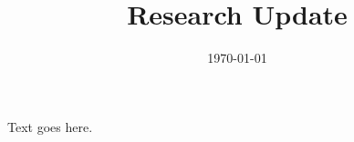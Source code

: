 \documentclass{dailyupdate}
\date{\today}
\title{Research Update}
\begin{document}
Text goes here.
\end{document}
